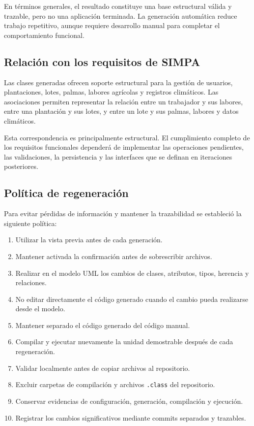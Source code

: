 \documentclass[11pt,a4paper]{article}
\begin{document}
En términos generales, el resultado constituye una base estructural válida y trazable, pero no una aplicación terminada. La generación automática reduce trabajo repetitivo, aunque requiere desarrollo manual para completar el comportamiento funcional.

\subsection{Relación con los requisitos de SIMPA}

Las clases generadas ofrecen soporte estructural para la gestión de usuarios, plantaciones, lotes, palmas, labores agrícolas y registros climáticos. Las asociaciones permiten representar la relación entre un trabajador y sus labores, entre una plantación y sus lotes, y entre un lote y sus palmas, labores y datos climáticos.

Esta correspondencia es principalmente estructural. El cumplimiento completo de los requisitos funcionales dependerá de implementar las operaciones pendientes, las validaciones, la persistencia y las interfaces que se definan en iteraciones posteriores.

\subsection{Política de regeneración}

Para evitar pérdidas de información y mantener la trazabilidad se estableció la siguiente política:

\begin{enumerate}
    \item Utilizar la vista previa antes de cada generación.
    \item Mantener activada la confirmación antes de sobrescribir archivos.
    \item Realizar en el modelo UML los cambios de clases, atributos, tipos, herencia y relaciones.
    \item No editar directamente el código generado cuando el cambio pueda realizarse desde el modelo.
    \item Mantener separado el código generado del código manual.
    \item Compilar y ejecutar nuevamente la unidad demostrable después de cada regeneración.
    \item Validar localmente antes de copiar archivos al repositorio.
    \item Excluir carpetas de compilación y archivos \texttt{.class} del repositorio.
    \item Conservar evidencias de configuración, generación, compilación y ejecución.
    \item Registrar los cambios significativos mediante commits separados y trazables.
\end{enumerate}
\end{document}
